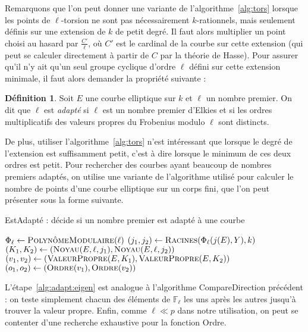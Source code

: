 \documentclass[11pt,a4paper]{article}
\newcommand{\F}{\mathbb{F}}
\theoremstyle{definition}
\newtheorem*{defi}{Définition}
\begin{document}
Remarquons que l'on peut donner une variante de l'algorithme~\ref{alg:tors} lorsque les points de $\ell$-torsion ne sont pas nécessairement $k$-rationnels, mais seulement définis sur une extension de $k$ de petit degré. Il faut alors multiplier un point choisi au hasard par $\frac{C'}{\ell}$, où $C'$ est le cardinal de la courbe sur cette extension (qui peut se calculer directement à partir de $C$ par la théorie de Hasse). Pour assurer qu'il n'y ait qu'un seul groupe cyclique d'ordre $\ell$ défini sur cette extension minimale, il faut alors demander la propriété suivante :

\begin{defi}
Soit $E$ une courbe elliptique sur $k$ et $\ell$ un nombre premier. On dit que $\ell$ est \emph{adapté} si $\ell$ est un nombre premier d'Elkies et si les ordres multiplicatifs des valeurs propres du Frobenius modulo $\ell$ sont distincts.
\end{defi}

De plus, utiliser l'algorithme~\ref{alg:tors} n'est intéressant que lorsque le degré de l'extension est suffisamment petit, c'est à dire lorsque le minimum de ces deux ordres est petit. Pour rechercher des courbes ayant beaucoup de nombres premiers adaptés, on utilise une variante de l'algorithme utilisé pour calculer le nombre de points d'une courbe elliptique sur un corps fini, que l'on peut présenter sous la forme suivante.


\begin{algorithm}
\caption{{\sc EstAdapté} : décide si un nombre premier est adapté à une courbe}
\label{alg:adapt}
$\Phi_\ell \gets \textsc{PolynômeModulaire}(\ell)$
\label{alg:adapt:polmod}
\;
$(j_1,j_2) \gets \textsc{Racines}(\Phi_\ell(j(E), Y), k)$
\label{alg:adapt:roots}
\;
$(K_1, K_2) \gets (\textsc{Noyau}(E,\ell,j_1), \textsc{Noyau}(E,\ell,j_2))$
\label{alg:adapt:ker}
\;
$(v_1, v_2) \gets (\textsc{ValeurPropre}(E, K_1), \textsc{ValeurPropre}(E, K_2))$
\label{alg:adapt:eigen}
\;
$(o_1, o_2) \gets (\textsc{Ordre}(v_1),\textsc{Ordre}(v_2))$
\label{alg:adapt:ord}
\;
\end{algorithm}

L'étape~\ref{alg:adapt:eigen} est analogue à l'algorithme {\sc CompareDirection} précédent : on teste simplement chacun des éléments de $\F_\ell$ les uns après les autres jusqu'à trouver la valeur propre. Enfin, comme $\ell \ll p$ dans notre utilisation, on peut se contenter d'une recherche exhaustive pour la fonction {\sc Ordre}.
\end{document}
